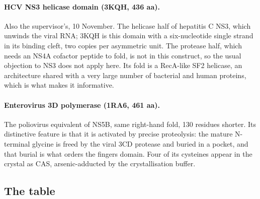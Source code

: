 \documentclass[11pt,a4paper]{article}
\begin{document}
\paragraph{HCV NS3 helicase domain (3KQH, 436 aa).} Also the supervisor's,
10 November. The helicase half of hepatitis C NS3, which unwinds the viral RNA;
3KQH is this domain with a six-nucleotide single strand in its binding cleft,
two copies per asymmetric unit. The protease half, which needs an NS4A cofactor
peptide to fold, is not in this construct, so the usual objection to NS3 does
not apply here. Its fold is a RecA-like SF2 helicase, an architecture shared with
a very large number of bacterial and human proteins, which is what makes it
informative.

\paragraph{Enterovirus 3D polymerase (1RA6, 461 aa).} The poliovirus equivalent
of NS5B, same right-hand fold, 130 residues shorter. Its distinctive feature is
that it is activated by precise proteolysis: the mature N-terminal glycine is
freed by the viral 3CD protease and buried in a pocket, and that burial is what
orders the fingers domain. Four of its cysteines appear in the crystal as CAS,
arsenic-adducted by the crystallisation buffer.

\subsection{The table}
\end{document}
